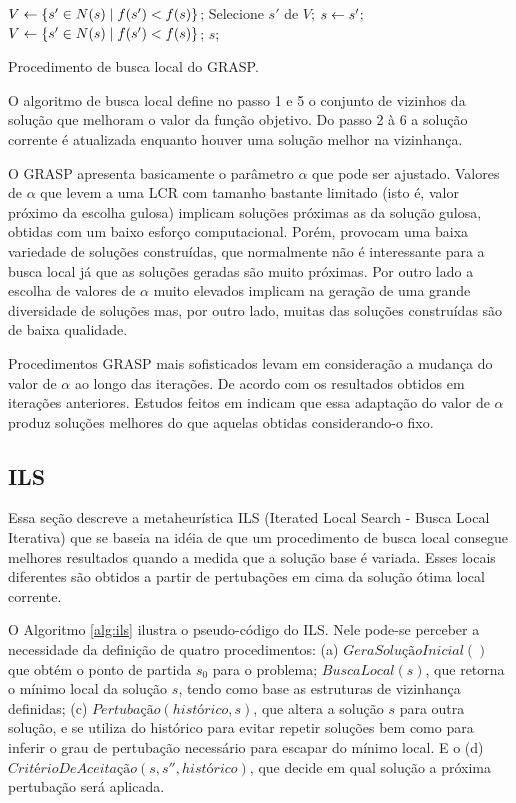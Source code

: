 \begin{pgrm}[h]
\begin{programma}
\STATE $V \leftarrow \{s{'} \in N(s) \mid f(s{'}) < f(s)\}$;
\STATE Selecione $s{'}$ de $V$;
\STATE $s \leftarrow s{'}$;
\STATE $V \leftarrow \{s{'} \in N(s) \mid f(s{'}) < f(s)\}$;
\ENDWHILE
\STATE\RETURN $s$;
\ENDALGORITHM
\end{programma}
\caption{Procedimento de busca local do GRASP.}\label{alg:grasplocal}
\end{pgrm}

O algoritmo de busca local define no passo 1 e 5 o conjunto de vizinhos da solução que melhoram o valor da função objetivo. Do passo 2 à 6 a solução corrente é atualizada enquanto houver uma solução melhor na vizinhança. 

O GRASP apresenta basicamente o parâmetro $\alpha$ que pode ser ajustado. Valores de $\alpha$ que levem a uma LCR com tamanho bastante limitado (isto é, valor próximo da escolha gulosa) implicam soluções próximas as da solução gulosa, obtidas com um baixo esforço computacional. Porém, provocam uma baixa variedade de soluções construídas, que normalmente não é interessante para a busca local já que as soluções geradas são muito próximas. Por outro lado a escolha de valores de $\alpha$ muito elevados implicam na geração de uma grande diversidade de soluções mas, por outro lado, muitas das soluções construídas são de baixa qualidade.

Procedimentos GRASP mais sofisticados levam em consideração a mudança do valor de $\alpha$ ao longo das iterações. De acordo com os resultados obtidos em iterações anteriores. Estudos feitos em \cite{prais2000} indicam que essa adaptação do valor de $\alpha$ produz soluções melhores do que aquelas obtidas considerando-o fixo.

\subsection{ILS}

Essa seção descreve a metaheurística ILS (Iterated Local Search - Busca Local Iterativa) que se baseia na idéia de que um procedimento de busca local consegue melhores resultados quando a medida que a solução base é variada. Esses locais diferentes são obtidos a partir de pertubações em cima da solução ótima local corrente.

O Algoritmo \ref{alg:ils} ilustra o pseudo-código do ILS. Nele pode-se perceber a necessidade da definição de quatro procedimentos: (a) $GeraSoluçãoInicial()$ que obtém o ponto de partida $s_{0}$ para o problema; $BuscaLocal(s)$, que retorna o mínimo local da solução $s$, tendo como base as estruturas de vizinhança definidas; (c) $Pertubação(histórico, s)$, que altera a solução $s$ para outra solução, e se utiliza do histórico para evitar repetir soluções bem como para inferir o grau de pertubação necessário para escapar do mínimo local. E o (d) $CritérioDeAceitação(s, s{''}, histórico)$, que decide em qual solução a próxima pertubação será aplicada.

